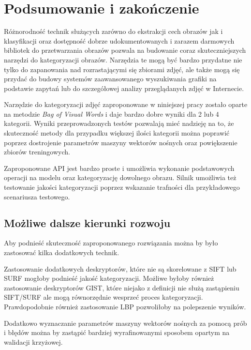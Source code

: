 \chapter{Podsumowanie i zakończenie}

Różnorodność technik służących zarówno do ekstrakcji cech obrazów jak i klasyfikacji oraz dostępność dobrze udokumentowanych i zarazem darmowych bibliotek do przetwarzania obrazów pozwala na budowanie coraz skuteczniejszych narzędzi do kategoryzacji obrazów. Narzędzia te mogą być bardzo przydatne nie tylko do zapanowania nad rozrastającymi się zbiorami zdjęć, ale także mogą się przydać do budowy systemów zaawansowanego wyszukiwania grafiki na podstawie zapytań lub do szczegółowej analizy przeglądanych zdjęć w Internecie.

Narzędzie do kategoryzacji zdjęć zaproponowane w niniejszej pracy zostało oparte na metodzie \emph{Bag of Visual Words} i daje bardzo dobre wyniki dla 2 lub 4 kategorii. Wyniki przeprowadzonych testów pozwalają mieć nadzieję na to, że skuteczność metody dla przypadku większej ilości kategorii można poprawić poprzez dostrojenie parametrów maszyny wektorów nośnych oraz powiększenie zbiorów treningowych.

Zaproponowane API jest bardzo proste i umożliwia wykonanie podstawowych operacji na modelu oraz kategoryzację dowolnego obrazu. Silnik umożliwia też testowanie jakości kategoryzacji poprzez wskazanie trafności dla przykładowego scenariusza testowego. 

\section{Możliwe dalsze kierunki rozwoju}

Aby podnieść skuteczność zaproponowanego rozwiązania można by było zastosować kilka dodatkowych technik.

Zastosowanie dodatkowych deskryptorów, które nie są skorelowane z SIFT lub SURF mogłoby podnieść jakość kategoryzacji. Możliwe byłoby również zastosowanie deskryptorów GIST, które niejako z definicji nie służą zastąpieniu SIFT/SURF ale mogą równorzędnie wesprzeć proces kategoryzacji. Prawdopodobnie również zastosowanie LBP pozwoliłoby na polepszenie wyników.  

Dodatkowo wyznaczanie parametrów maszyny wektorów nośnych za pomocą prób i błędów można by zastąpić bardziej wyrafinowanymi sposobem opartym na walidacji krzyżowej.